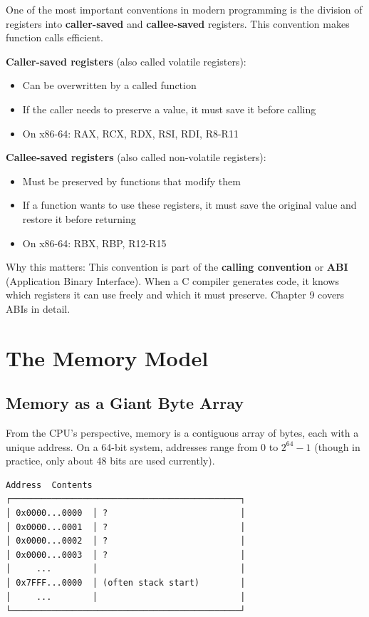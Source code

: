 One of the most important conventions in modern programming is the division of registers into \textbf{caller-saved} and \textbf{callee-saved} registers. This convention makes function calls efficient.

\textbf{Caller-saved registers} (also called volatile registers):
\begin{itemize}
  \item Can be overwritten by a called function
  \item If the caller needs to preserve a value, it must save it before calling
  \item On x86-64: RAX, RCX, RDX, RSI, RDI, R8-R11
\end{itemize}

\textbf{Callee-saved registers} (also called non-volatile registers):
\begin{itemize}
  \item Must be preserved by functions that modify them
  \item If a function wants to use these registers, it must save the original value and restore it before returning
  \item On x86-64: RBX, RBP, R12-R15
\end{itemize}

\begin{warning}
  Why this matters: This convention is part of the \textbf{calling convention} or \textbf{ABI} (Application Binary Interface). When a C compiler generates code, it knows which registers it can use freely and which it must preserve. Chapter 9 covers ABIs in detail.
\end{warning}

\section{The Memory Model}

\subsection{Memory as a Giant Byte Array}

From the CPU's perspective, memory is a contiguous array of bytes, each with a unique address. On a 64-bit system, addresses range from 0 to \(2^{64}-1\) (though in practice, only about 48 bits are used currently).

\begin{verbatim}
Address  Contents
┌─────────────────────────────────────────────┐
│ 0x0000...0000  │ ?                          │
│ 0x0000...0001  │ ?                          │
│ 0x0000...0002  │ ?                          │
│ 0x0000...0003  │ ?                          │
│     ...        │                            │
│ 0x7FFF...0000  │ (often stack start)        │
│     ...        │                            │
└─────────────────────────────────────────────┘
\end{verbatim}

